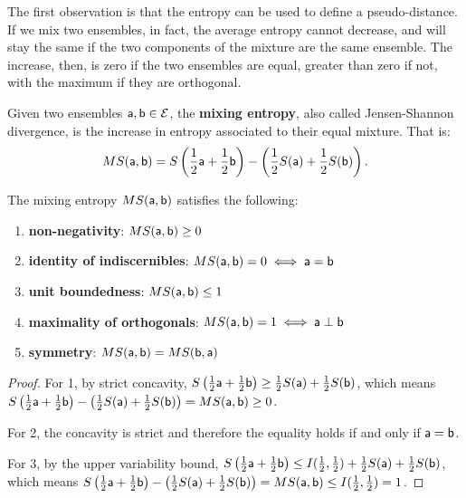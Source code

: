 The first observation is that the entropy can be used to define a pseudo-distance. If we mix two ensembles, in fact, the average entropy cannot decrease, and will stay the same if the two components of the mixture are the same ensemble. The increase, then, is zero if the two ensembles are equal, greater than zero if not, with the maximum if they are orthogonal. 

\begin{mathSection}
\begin{defn}
	Given two ensembles $\ens[a], \ens[b] \in \Ens$, the \textbf{mixing entropy}, also called Jensen-Shannon divergence, is the increase in entropy associated to their equal mixture. That is:
	$$MS(\ens[a], \ens[b]) = S\left(\frac{1}{2}\ens[a] + \frac{1}{2} \ens[b]\right) - \left(\frac{1}{2} S(\ens[a]) + \frac{1}{2} S(\ens[b])\right).$$
\end{defn}

\begin{prop}
	The mixing entropy $MS(\ens[a], \ens[b])$ satisfies the following:
	\begin{enumerate}
		\item \textbf{non-negativity}: $MS(\ens[a], \ens[b]) \geq 0$
		\item \textbf{identity of indiscernibles}: $MS(\ens[a], \ens[b]) = 0 \iff \ens[a]=\ens[b]$
		\item \textbf{unit boundedness}: $MS(\ens[a], \ens[b]) \leq 1$
		\item \textbf{maximality of orthogonals}: $MS(\ens[a], \ens[b]) = 1 \iff \ens[a] \ortho \ens[b]$
		\item \textbf{symmetry}: $MS(\ens[a], \ens[b]) = MS(\ens[b], \ens[a])$
	\end{enumerate}
\end{prop}

\begin{proof}
	For 1, by strict concavity, $S\left(\frac{1}{2} \ens[a] + \frac{1}{2} \ens[b]\right) \geq \frac{1}{2} S(\ens[a]) + \frac{1}{2} S(\ens[b])$, which means $S\left(\frac{1}{2} \ens[a] + \frac{1}{2} \ens[b]\right) - \left(\frac{1}{2} S(\ens[a]) + \frac{1}{2} S(\ens[b])\right) = MS(\ens[a], \ens[b]) \geq 0$.
	
	For 2, the concavity is strict and therefore the equality holds if and only if $\ens[a] = \ens[b]$.
	
	For 3, by the upper variability bound, $S\left(\frac{1}{2} \ens[a] + \frac{1}{2} \ens[b]\right) \leq I(\frac{1}{2}, \frac{1}{2}) + \frac{1}{2} S(\ens[a]) + \frac{1}{2} S(\ens[b])$, which means $S\left(\frac{1}{2} \ens[a] + \frac{1}{2} \ens[b]\right) - \left(\frac{1}{2} S(\ens[a]) + \frac{1}{2} S(\ens[b])\right) = MS(\ens[a], \ens[b]) \leq I(\frac{1}{2}, \frac{1}{2}) = 1$.
	

\end{proof}
\end{mathSection}
